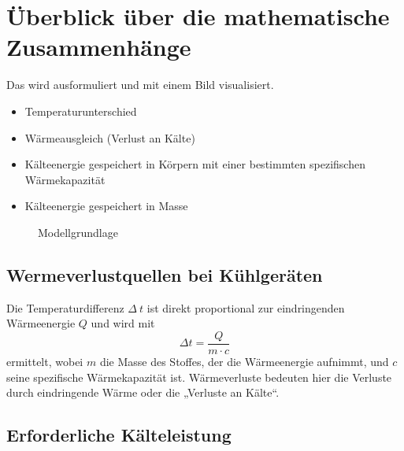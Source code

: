 \section{Überblick über die mathematische Zusammenhänge}

Das wird ausformuliert und mit einem Bild visualisiert.
\begin{itemize}
	\item Temperaturunterschied
	\item Wärmeausgleich (Verlust an Kälte)
	\item Kälteenergie gespeichert in Körpern mit einer bestimmten spezifischen Wärmekapazität
	\item Kälteenergie gespeichert in Masse
\end{itemize}
\begin{figure}\caption{ Modellgrundlage}
\end{figure}

\subsection{Wermeverlustquellen bei Kühlgeräten}

Die Temperaturdifferenz $\Delta\:t$ ist direkt proportional zur eindringenden Wärmeenergie $Q$ und wird mit
\begin{equation}
	\Delta t = \frac{Q}{m\cdot c}
\label{tdif}
\end{equation}
ermittelt, wobei $m$ die Masse des Stoffes, der die Wärmeenergie aufnimmt, und $c$ seine spezifische Wärmekapazität ist.
Wärmeverluste bedeuten hier die Verluste durch eindringende Wärme oder die „Verluste an Kälte“\cite{caro}.

\subsection{Erforderliche Kälteleistung}


